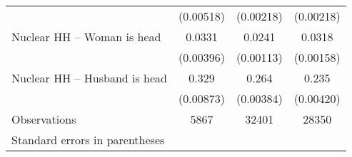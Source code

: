 {\begin{tabular}{l*{3}{c}}
                    &   (0.00518)         &   (0.00218)         &   (0.00218)         \\
\addlinespace
Nuclear HH – Woman is head&      0.0331\sym{***}&      0.0241\sym{***}&      0.0318\sym{***}\\
                    &   (0.00396)         &   (0.00113)         &   (0.00158)         \\
\addlinespace
Nuclear HH – Husband is head&       0.329\sym{***}&       0.264\sym{***}&       0.235\sym{***}\\
                    &   (0.00873)         &   (0.00384)         &   (0.00420)         \\
\midrule
Observations        &        5867         &       32401         &       28350         \\
\bottomrule
\multicolumn{4}{l}{\footnotesize Standard errors in parentheses}\\

\end{tabular}
}
